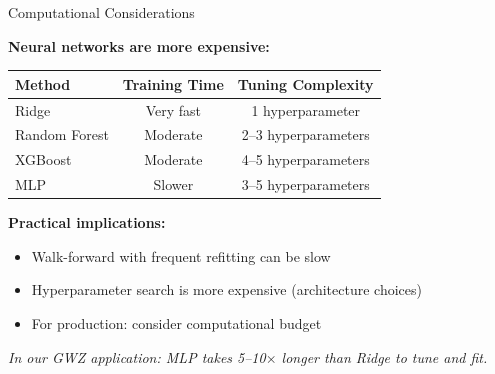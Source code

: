 \documentclass[10pt]{beamer}
\begin{document}
\begin{frame}{Computational Considerations}

  \textbf{Neural networks are more expensive:}

  \vspace{0.5em}
  \begin{center}
  \begin{tabular}{lcc}
    \toprule
    \textbf{Method} & \textbf{Training Time} & \textbf{Tuning Complexity} \\
    \midrule
    Ridge & Very fast & 1 hyperparameter \\
    Random Forest & Moderate & 2--3 hyperparameters \\
    XGBoost & Moderate & 4--5 hyperparameters \\
    MLP & Slower & 3--5 hyperparameters \\
    \bottomrule
  \end{tabular}
  \end{center}

  \vspace{1em}
  \textbf{Practical implications:}
  \begin{itemize}
    \item Walk-forward with frequent refitting can be slow
    \item Hyperparameter search is more expensive (architecture choices)
    \item For production: consider computational budget
  \end{itemize}

  \vspace{0.5em}
  \textit{In our GWZ application: MLP takes 5--10$\times$ longer than Ridge to tune and fit.}
\end{frame}

\end{document}
